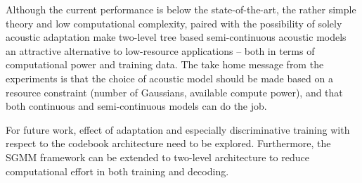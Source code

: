\documentclass{article}
\begin{document}
Although the current performance is below the state-of-the-art, the
rather simple theory and low computational complexity, paired with the possibility
of solely acoustic adaptation make two-level tree based semi-continuous acoustic
models an attractive alternative to low-resource applications -- both in terms
of computational power and training data.
%
The take home message from the experiments is that the choice of acoustic model
should be made based on a resource constraint (number of Gaussians, available
compute power), and that both continuous and semi-continuous models can do the job.

For future work, effect of adaptation and especially discriminative training
with respect to the codebook architecture need to be explored.
Furthermore, the SGMM framework can be extended to two-level architecture to 
reduce computational effort in both training and decoding.




\end{document}
